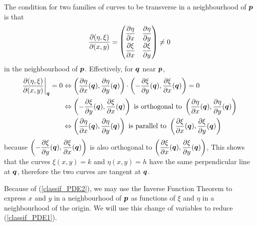 The condition for two families of curves to be transverse in a
neighbourhood of ${\bm{p}}$ is that
\begin{equation} \label{classif_PDE2}
\frac{\partial (\eta, \xi)}{\partial (x,y)} =
\begin{pmatrix}
\displaystyle \frac{\partial{\eta}}{\partial x} & \displaystyle \frac{\partial{\eta}}{\partial y} \\[0.7em]
\displaystyle \frac{\partial{\xi}}{\partial x} & \displaystyle \frac{\partial{\xi}}{\partial y}
\end{pmatrix} \neq 0
\end{equation}
in the neighbourhood of ${\bm{p}}$.  Effectively, for ${\bm{q}}$ near
${\bm{p}}$,
\begin{align*}
\frac{\partial (\eta, \xi)}{\partial (x,y)}\bigg|_{\VEC{q}} = 0
& \Leftrightarrow 
\left(\pdydx{\eta}{x}(\VEC{q}),\pdydx{\eta}{y}(\VEC{q})\right)
\cdot \left(-\pdydx{\xi}{y}(\VEC{q}), \pdydx{\xi}{x}(\VEC{q})\right) = 0 \\
& \Leftrightarrow
\left(-\pdydx{\xi}{y}(\VEC{q}), \pdydx{\xi}{x}(\VEC{q})\right) \ 
\text{is orthogonal to} \ 
\left(\pdydx{\eta}{x}(\VEC{q}),\pdydx{\eta}{y}(\VEC{q})\right) \\
& \Leftrightarrow
\left(\pdydx{\eta}{x}(\VEC{q}),\pdydx{\eta}{y}(\VEC{q})\right) \ 
\text{is parallel to} \ 
\left(\pdydx{\xi}{x}(\VEC{q}),\pdydx{\xi}{y}(\VEC{q})\right)
\end{align*}
because
$\displaystyle \left(-\frac{\partial{\xi}}{\partial y}({\bm{q}}), \frac{\partial{\xi}}{\partial x}({\bm{q}})\right)$
is also orthogonal to
$\displaystyle \left(\frac{\partial{\xi}}{\partial x}({\bm{q}}),\frac{\partial{\xi}}{\partial y}({\bm{q}})\right)$,
This shows that the curves $\xi(x,y)=k$ and $\eta(x,y)=h$ have the
same perpendicular line at ${\bm{q}}$, therefore the two curves are
tangent at ${\bm{q}}$.

Because of (\ref{classif_PDE2}), we may use the Inverse Function
Theorem to express $x$ and $y$ in a neighbourhood of ${\bm{p}}$ as
functions of $\xi$ and $\eta$ in a neighbourhood of the origin.  We
will use this change of variables to reduce (\ref{classif_PDE1}).

